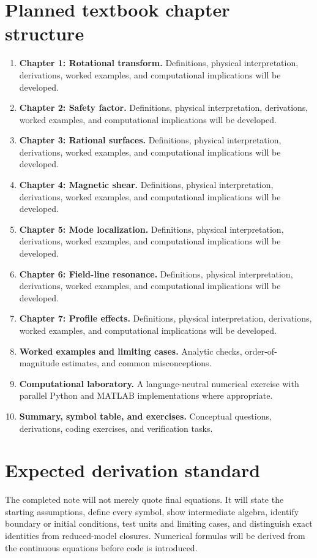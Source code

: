 \documentclass[11pt]{article}
\begin{document}
\section{Planned textbook chapter structure}
\begin{enumerate}[leftmargin=1.8em]
\item \textbf{Chapter 1: Rotational transform.} Definitions, physical interpretation, derivations, worked examples, and computational implications will be developed.
\item \textbf{Chapter 2: Safety factor.} Definitions, physical interpretation, derivations, worked examples, and computational implications will be developed.
\item \textbf{Chapter 3: Rational surfaces.} Definitions, physical interpretation, derivations, worked examples, and computational implications will be developed.
\item \textbf{Chapter 4: Magnetic shear.} Definitions, physical interpretation, derivations, worked examples, and computational implications will be developed.
\item \textbf{Chapter 5: Mode localization.} Definitions, physical interpretation, derivations, worked examples, and computational implications will be developed.
\item \textbf{Chapter 6: Field-line resonance.} Definitions, physical interpretation, derivations, worked examples, and computational implications will be developed.
\item \textbf{Chapter 7: Profile effects.} Definitions, physical interpretation, derivations, worked examples, and computational implications will be developed.
\item \textbf{Worked examples and limiting cases.} Analytic checks, order-of-magnitude estimates, and common misconceptions.
\item \textbf{Computational laboratory.} A language-neutral numerical exercise with parallel Python and MATLAB implementations where appropriate.
\item \textbf{Summary, symbol table, and exercises.} Conceptual questions, derivations, coding exercises, and verification tasks.
\end{enumerate}

\section{Expected derivation standard}
The completed note will not merely quote final equations. It will state the starting assumptions, define every symbol, show intermediate algebra, identify boundary or initial conditions, test units and limiting cases, and distinguish exact identities from reduced-model closures. Numerical formulas will be derived from the continuous equations before code is introduced.
\end{document}
